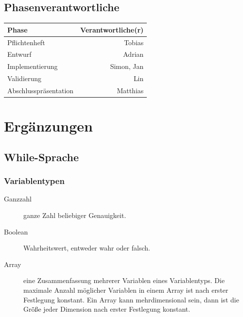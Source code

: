 \documentclass[a4paper,10pt]{article}
\begin{document}
\subsection{Phasenverantwortliche}
\begin{tabular}[h]{| l | r |}
\hline
\textbf{Phase} & \textbf{Verantwortliche(r)}\\
\hline
Pflichtenheft & Tobias\\
\hline
Entwurf & Adrian\\
\hline
Implementierung & Simon, Jan\\
\hline
Validierung & Lin\\
\hline
Abschlusspr\"{a}sentation & Matthias\\
\hline
\end{tabular}

\newpage
\section{Erg\"{a}nzungen}
\subsection{While-Sprache}
\subsubsection{Variablentypen}
\begin{description}
\item[Ganzzahl] ganze Zahl beliebiger Genauigkeit.
\item[Boolean] Wahrheitswert, entweder wahr oder falsch.
\item[Array] eine Zusammenfassung mehrerer Variablen eines Variablentyps. Die maximale Anzahl m\"{o}glicher Variablen in einem Array ist nach erster Festlegung konstant. Ein Array kann mehrdimensional sein, dann ist die Gr\"{\"{o}}\ss{}e jeder Dimension nach erster Festlegung konstant.
\end{description}
\end{document}
